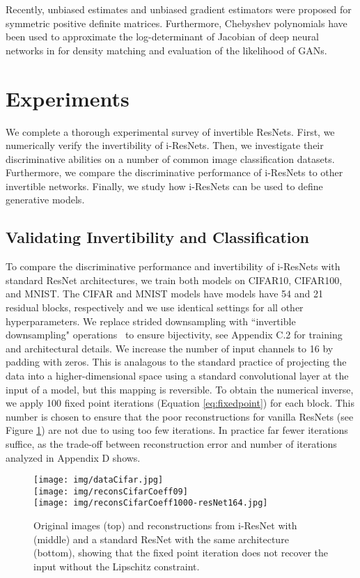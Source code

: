 \documentclass{article}
\begin{document}
Recently, unbiased estimates \citep{adams} and unbiased gradient estimators \citep{HanGradients} were proposed for symmetric positive definite matrices. Furthermore, Chebyshev polynomials have been used to approximate the log-determinant of Jacobian of deep neural networks in \citet{leCunSpectralBackprop} for density matching and evaluation of the likelihood of GANs.



\section{Experiments}
\label{sec:exp}
We complete a thorough experimental survey of invertible ResNets. First, we numerically verify the invertibility of i-ResNets. Then, we investigate their discriminative abilities on a number of common image classification datasets. Furthermore, we compare the discriminative performance of i-ResNets to other invertible networks. Finally, we study how i-ResNets can be used to define generative models.

\subsection{Validating Invertibility and Classification}

To compare the discriminative performance and invertibility of i-ResNets with standard ResNet architectures, we train both models on CIFAR10, CIFAR100, and MNIST. The CIFAR and MNIST models have models have 54 and 21 residual blocks, respectively and we use identical settings for all other hyperparameters. We replace strided downsampling with ``invertible downsampling" operations~\cite{jacobsen2018irevnet} to ensure bijectivity, see Appendix C.2 for training and architectural details. We increase the number of input channels to 16 by padding with zeros. 
This is analagous to the standard practice of projecting the data into a higher-dimensional space using a standard convolutional layer at the input of a model, but this mapping is reversible.
To obtain the numerical inverse, we apply 100 fixed point iterations (Equation \eqref{eq:fixedpoint}) for each block.
This number is chosen to ensure that the poor reconstructions for vanilla ResNets (see Figure \ref{fig:reconstructionCifar}) are not due to using too few iterations. In practice far fewer iterations suffice, as the trade-off between reconstruction error and number of iterations analyzed in Appendix D shows. 

\begin{figure}
\texttt{[image: img/dataCifar.jpg]}\\
\texttt{[image: img/reconsCifarCoeff09]}\\
\texttt{[image: img/reconsCifarCoeff1000-resNet164.jpg]}
\vspace{-7mm}
\caption{Original images (top) and reconstructions from i-ResNet with  (middle) and a standard ResNet with the same architecture (bottom), showing that the fixed point iteration does not recover the input without the Lipschitz constraint.}
    \label{fig:reconstructionCifar}

\end{figure}
\end{document}
